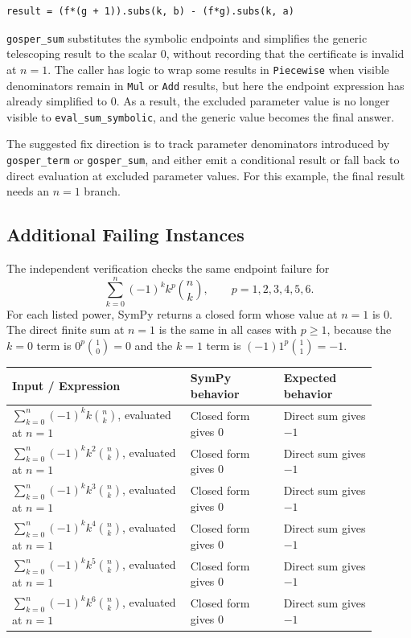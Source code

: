 \documentclass[11pt]{article}
\begin{document}
\begin{lstlisting}[style=bugpython]
result = (f*(g + 1)).subs(k, b) - (f*g).subs(k, a)
\end{lstlisting}

\texttt{gosper\_sum} substitutes the symbolic endpoints and simplifies the
generic telescoping result to the scalar \(0\), without recording that the
certificate is invalid at \(n=1\).  The caller has logic to wrap some results
in \texttt{Piecewise} when visible denominators remain in \texttt{Mul} or
\texttt{Add} results, but here the endpoint expression has already simplified
to \(0\).  As a result, the excluded parameter value is no longer visible to
\texttt{eval\_sum\_\allowbreak symbolic}, and the generic value becomes the
final answer.

The suggested fix direction is to track parameter denominators introduced by
\texttt{gosper\_term} or \texttt{gosper\_sum}, and either emit a conditional
result or fall back to direct evaluation at excluded parameter values.  For
this example, the final result needs an \(n=1\) branch.

\subsection{Additional Failing Instances}

The independent verification checks the same endpoint failure for
\[
  \sum_{k=0}^{n} (-1)^k k^p \binom{n}{k},
  \qquad p=1,2,3,4,5,6.
\]
For each listed power, SymPy returns a closed form whose value at \(n=1\) is
\(0\).  The direct finite sum at \(n=1\) is the same in all cases with
\(p\ge 1\), because the \(k=0\) term is \(0^p\binom{1}{0}=0\) and the \(k=1\)
term is \((-1)1^p\binom{1}{1}=-1\).

\begin{center}
\small
\renewcommand{\arraystretch}{1.3}
\begin{tabular}{@{}>{\raggedright\arraybackslash}p{0.44\linewidth}>{\raggedright\arraybackslash}p{0.23\linewidth}>{\raggedright\arraybackslash}p{0.23\linewidth}@{}}
\toprule
\textbf{Input / Expression} & \textbf{SymPy behavior} & \textbf{Expected behavior} \\
\midrule
\(\sum_{k=0}^{n}(-1)^k k\binom{n}{k}\), evaluated at \(n=1\) & Closed form gives \(0\) & Direct sum gives \(-1\) \\
\(\sum_{k=0}^{n}(-1)^k k^2\binom{n}{k}\), evaluated at \(n=1\) & Closed form gives \(0\) & Direct sum gives \(-1\) \\
\(\sum_{k=0}^{n}(-1)^k k^3\binom{n}{k}\), evaluated at \(n=1\) & Closed form gives \(0\) & Direct sum gives \(-1\) \\
\(\sum_{k=0}^{n}(-1)^k k^4\binom{n}{k}\), evaluated at \(n=1\) & Closed form gives \(0\) & Direct sum gives \(-1\) \\
\(\sum_{k=0}^{n}(-1)^k k^5\binom{n}{k}\), evaluated at \(n=1\) & Closed form gives \(0\) & Direct sum gives \(-1\) \\
\(\sum_{k=0}^{n}(-1)^k k^6\binom{n}{k}\), evaluated at \(n=1\) & Closed form gives \(0\) & Direct sum gives \(-1\) \\
\bottomrule
\end{tabular}
\end{center}
\end{document}

